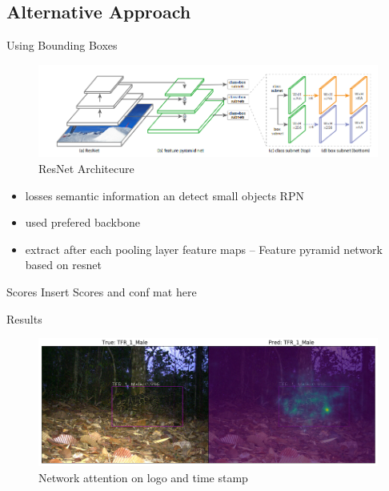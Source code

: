 \documentclass[10pt]{beamer}
\begin{document}
\subsection{Alternative Approach}
\begin{frame}{Using Bounding Boxes}
	\begin{figure}
		\includegraphics[width=\columnwidth]{images/retinanet.png}
		\caption{ResNet Architecure}
	\end{figure}

	\begin{itemize}
		\item losses semantic information an detect small objects RPN
		\item used prefered backbone
		\item extract after each pooling layer feature maps -- Feature pyramid network based on resnet

	\end{itemize}
\end{frame}


\begin{frame}{Scores}
	Insert Scores and conf mat here
\end{frame}

\begin{frame}{Results}
	\begin{figure}
		\includegraphics[width=\columnwidth]{images/RetinaNet_Attention_correct_good_quality2.png}
		\caption{Network attention on logo and time stamp}
	\end{figure}
\end{frame}
\end{document}
